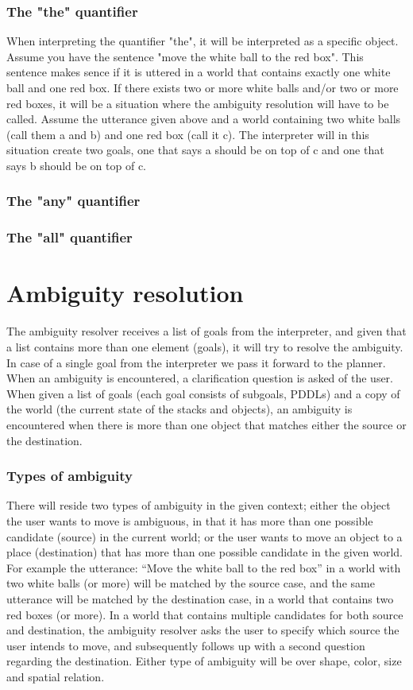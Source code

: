\documentclass[11pt]{article}
\begin{document}
\subsubsection*{The "the" quantifier}
When interpreting the quantifier "the", it will be interpreted as a specific object. Assume you have the sentence "move the white ball to the red box". This sentence makes sence if it is uttered in a world that contains exactly one white ball and one red box. If there exists two or more white balls and/or two or more red boxes, it will be a situation where the ambiguity resolution will have to be called. Assume the utterance given above and a world containing two white balls (call them a and b) and one red box (call it c). The interpreter will in this situation create two goals, one that says a should be on top of c and one that says b should be on top of c.

\subsubsection*{The "any" quantifier}


\subsubsection*{The "all" quantifier}



\section*{Ambiguity resolution}
The ambiguity resolver receives a list of goals from the interpreter, and given that a list contains more than one element (goals), it will try to resolve the ambiguity. In case of a single goal from the interpreter we pass it forward to the planner. When an ambiguity is encountered, a clarification question is asked of the user.
When given a list of goals (each goal consists of subgoals, PDDLs) and a copy of the world (the current state of the stacks and objects), an ambiguity is encountered when there is more than one object that matches either the source or the destination.

\subsubsection*{Types of ambiguity}
There will reside two types of ambiguity in the given context; either the object the user wants to move is ambiguous, in that it has more than one possible candidate (source) in the current world; or the user wants to move an object to a place (destination) that has more than one possible candidate in the given world. For example the utterance:
“Move the white ball to the red box”
in a world with two white balls (or more) will be matched by the source case, and the same utterance will be matched by the destination case, in a world that contains two red boxes (or more).
In a world that contains multiple candidates for both source and destination, the ambiguity resolver asks the user to specify which source the user intends to move, and subsequently follows up with a second question regarding the destination.
Either type of ambiguity will be over shape, color, size and spatial relation.
\end{document}
